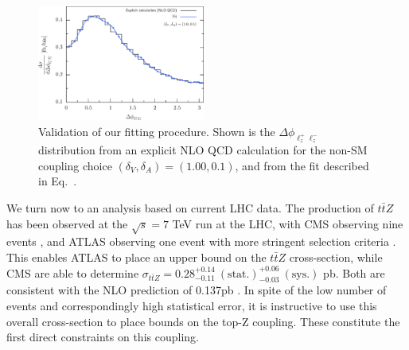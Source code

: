 \documentclass[preprint]{JHEP3} %
\def\ttbZ{t\bar{t}Z}
\begin{document}
\begin{figure}[t]
\centering %
\includegraphics[width=0.49\textwidth]{./LHC_53_Fig17d.eps}
\caption{\label{fig:iv} Validation of our fitting procedure. Shown is the $\Delta \phi_{\ell^+_z \ell^-_z}$ distribution from an explicit NLO QCD calculation 
for the non-SM coupling choice $(\delta_V,\delta_A)=(1.00,0.1)$, and from the fit described in Eq.~\cite{eq:couplfit}. }
\end{figure}
We turn now to an analysis based on current LHC data. The production of $\ttbZ$ has been observed at the $\sqrt{s}=7$ TeV run at the LHC, 
with CMS observing nine events \cite{Chatrchyan:2013qca}, and ATLAS observing one event with more stringent selection criteria \cite{ATLAS-CONF-2012-126}. 
This enables ATLAS to place an upper bound on the $\ttbZ$ cross-section, 
while CMS are able to determine $\sigma_{\ttbZ} = 0.28^{+0.14}_{-0.11}~\mathrm{(stat.)}^{+0.06}_{-0.03}~ \mathrm{(sys.)}$ pb. 
Both are consistent with the NLO prediction of 0.137pb \cite{Garzelli:2011is}. 
In spite of the low number of events and correspondingly high statistical error, it is instructive to use this overall cross-section to place bounds on the top-Z coupling. 
These constitute the first direct constraints on this coupling.
\end{document}
